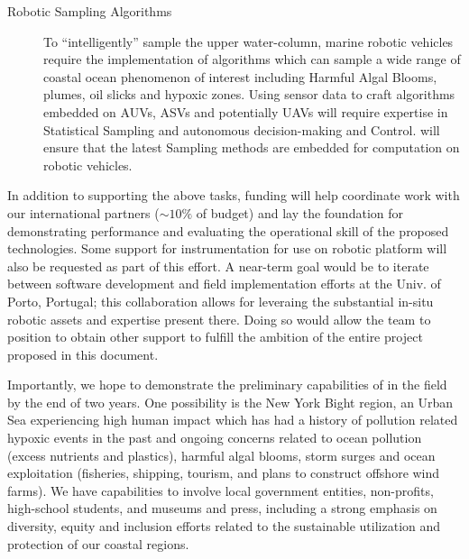 \begin{description}
\item[Robotic Sampling Algorithms] To ``intelligently'' sample the upper
  water-column, marine robotic vehicles require the implementation of
  algorithms which can sample a wide range of coastal ocean phenomenon
  of interest including Harmful Algal Blooms, plumes, oil slicks and
  hypoxic zones. Using sensor data to craft algorithms embedded on AUVs,
  ASVs and potentially UAVs will require expertise in Statistical
  Sampling and autonomous decision-making and Control. \pro will ensure
  that the latest Sampling methods are embedded for computation on
  robotic vehicles.

\end{description}

\noindent
In addition to supporting the above tasks, \kck funding will help
coordinate work with our international partners ($\sim 10\%$ of
budget) and lay the foundation for demonstrating performance and
evaluating the operational skill of the proposed technologies. Some
support for instrumentation for use on robotic platform will also be
requested as part of this effort. A near-term goal would be to iterate
between software development and field implementation efforts at the
Univ. of Porto, Portugal; this collaboration allows for leveraing the
substantial in-situ robotic assets and expertise present there.  Doing
so would allow the team to position \pro to obtain other support to
fulfill the ambition of the entire project proposed in this document.

Importantly, we hope to demonstrate the preliminary capabilities of
\pro in the field by the end of two years.  One possibility is the New
York Bight region, an Urban Sea experiencing high human impact which
has had a history of pollution related hypoxic events in the past and
ongoing concerns related to ocean pollution (excess nutrients and
plastics), harmful algal blooms, storm surges and ocean exploitation
(fisheries, shipping, tourism, and plans to construct offshore wind
farms). We have capabilities to involve local government entities,
non-profits, high-school students, and museums and press, including a
strong emphasis on diversity, equity and inclusion efforts related to
the sustainable utilization and protection of our coastal regions.

